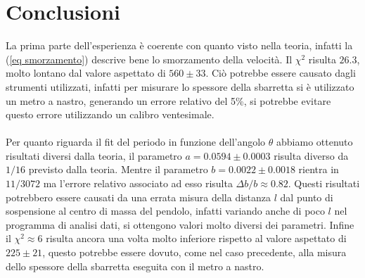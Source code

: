 \documentclass{article}
\begin{document}
	\section{Conclusioni}
		La prima parte dell'esperienza \`{e} coerente con quanto visto nella teoria, infatti la (\ref{eq smorzamento}) descrive bene lo smorzamento della velocit\`{a}. Il $\chi^2$ risulta $26.3$, molto lontano dal valore aspettato di $560\pm33$. Ci\`{o} potrebbe essere causato dagli strumenti utilizzati, infatti per misurare lo spessore della sbarretta si \`{e} utilizzato un metro a nastro, generando un errore relativo del 5\%, si potrebbe evitare questo errore utilizzando un calibro ventesimale.\\\\Per quanto riguarda il fit del periodo in funzione dell'angolo $\theta$ abbiamo ottenuto risultati diversi dalla teoria, il parametro $a = 0.0594\pm0.0003$ risulta diverso da $1/16$ previsto dalla teoria. Mentre il parametro $b = 0.0022\pm0.0018$ rientra in $11/3072$ ma l'errore relativo associato ad esso risulta $\Delta b/b \approx 0.82$. Questi risultati potrebbero essere causati da una errata misura della distanza $l$ dal punto di sospensione al centro di massa del pendolo, infatti variando anche di poco $l$ nel programma di analisi dati, si ottengono valori molto diversi dei parametri. Infine il $\chi^2\approx6$ risulta ancora una volta molto inferiore rispetto al valore aspettato di $225\pm21$, questo potrebbe essere dovuto, come nel caso precedente, alla misura dello spessore della sbarretta eseguita con il metro a nastro.
\end{document}
